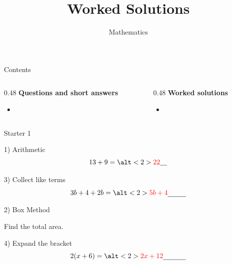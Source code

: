 \documentclass{beamer}
\title{Worked Solutions}
\author{Mathematics}
\date{}
\newcommand{\ablank}[1]{%
  \alt<2>{\textcolor{red}{#1}}{\underline{\phantom{#1}}}%
}
\newcommand{\ashow}[1]{\uncover<2->{\textcolor{red}{\small #1}}}
\newcommand{\ashowq}[1]{\alt<2->{\textcolor{red}{\small #1}}{?}}
\begin{document}
\frame{\titlepage}

\begin{frame}{Contents}
\small
\begin{columns}[T]
\begin{column}{0.48\textwidth}
\textbf{Questions and short answers}
\begin{itemize}
  \item \hyperlink{q-st1}{}
\end{itemize}
\end{column}
\begin{column}{0.48\textwidth}
\textbf{Worked solutions}
\begin{itemize}
  \item \hyperlink{work-st1}{}
\end{itemize}
\end{column}
\end{columns}
\end{frame}

\begin{frame}{Starter 1}
\hypertarget{q-st1}{}
\begin{minipage}[t]{0.48\textwidth}

\begin{block}{1) Arithmetic}
\Large
\[
13 + 9 = \ablank{22}
\]
\end{block}

\vspace{6.2em}

\begin{block}{3) Collect like terms}
\Large
\[
3b + 4 + 2b = \ablank{5b+4}
\]
\end{block}

\end{minipage}\hfill
\begin{minipage}[t]{0.48\textwidth}

\begin{block}{2) Box Method}
\centering
{}

\vspace{0.4em}
Find the total area. \ashow{Total area $= 32$}

\end{block}

\vspace{0.6em}

\begin{block}{4) Expand the bracket}
\Large
\[
2(x+6) = \ablank{2x+12}
\]
\end{block}

\end{minipage}
\end{frame}
\end{document}
